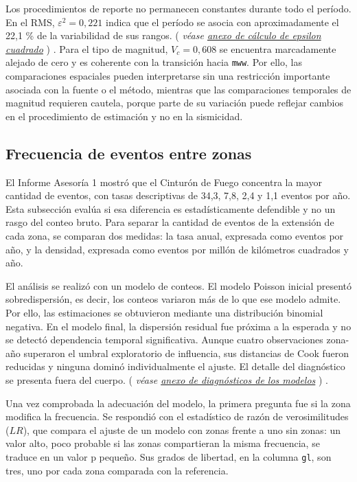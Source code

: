 \documentclass[
  spanish,
  letterpaper,
  DIV=11,
  numbers=noendperiod]{scrartcl}
\newcommand{\asesoriaParenRef}[1]{%
  \textnormal{\textcolor{asesoriaTextColor}{(}}%
  {\hypersetup{linkcolor=asesoriaLinkColor,urlcolor=asesoriaLinkColor,citecolor=asesoriaLinkColor}\textcolor{asesoriaTextColor}{\emph{#1}}}%
  \textnormal{\textcolor{asesoriaTextColor}{)}}%
}
\begin{document}
Los procedimientos de reporte no permanecen constantes durante todo el
período. En el RMS, \(\varepsilon^2=0{,}221\) indica que el período se
asocia con aproximadamente el 22,1 \% de la variabilidad de sus rangos.
\asesoriaParenRef{véase \hyperref[sec-anexo-epsilon]{anexo de cálculo de epsilon cuadrado}}.
Para el tipo de magnitud, \(V_c=0{,}608\) se encuentra marcadamente
alejado de cero y es coherente con la transición hacia \texttt{mww}. Por
ello, las comparaciones espaciales pueden interpretarse sin una
restricción importante asociada con la fuente o el método, mientras que
las comparaciones temporales de magnitud requieren cautela, porque parte
de su variación puede reflejar cambios en el procedimiento de estimación
y no en la sismicidad.

\subsection{Frecuencia de eventos entre zonas}\label{sec-res-frecuencia}

El Informe Asesoría 1 mostró que el Cinturón de Fuego concentra la mayor
cantidad de eventos, con tasas descriptivas de 34,3, 7,8, 2,4 y 1,1
eventos por año. Esta subsección evalúa si esa diferencia es
estadísticamente defendible y no un rasgo del conteo bruto. Para separar
la cantidad de eventos de la extensión de cada zona, se comparan dos
medidas: la tasa anual, expresada como eventos por año, y la densidad,
expresada como eventos por millón de kilómetros cuadrados y año.

El análisis se realizó con un modelo de conteos. El modelo Poisson
inicial presentó sobredispersión, es decir, los conteos variaron más de
lo que ese modelo admite. Por ello, las estimaciones se obtuvieron
mediante una distribución binomial negativa. En el modelo final, la
dispersión residual fue próxima a la esperada y no se detectó
dependencia temporal significativa. Aunque cuatro observaciones zona-año
superaron el umbral exploratorio de influencia, sus distancias de Cook
fueron reducidas y ninguna dominó individualmente el ajuste. El detalle
del diagnóstico se presenta fuera del cuerpo.
\asesoriaParenRef{véase \hyperref[sec-anexo-diagnosticos]{anexo de diagnósticos de los modelos}}.

Una vez comprobada la adecuación del modelo, la primera pregunta fue si
la zona modifica la frecuencia. Se respondió con el estadístico de razón
de verosimilitudes (\(LR\)), que compara el ajuste de un modelo con
zonas frente a uno sin zonas: un valor alto, poco probable si las zonas
compartieran la misma frecuencia, se traduce en un valor p pequeño. Sus
grados de libertad, en la columna \texttt{gl}, son tres, uno por cada
zona comparada con la referencia.
\end{document}
